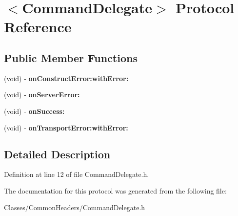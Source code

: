 \hypertarget{protocol_command_delegate-p}{
\section{$<$CommandDelegate$>$ Protocol Reference}
\label{protocol_command_delegate-p}
}
\subsection*{Public Member Functions}
\begin{DoxyCompactItemize}
\item 
\hypertarget{protocol_command_delegate-p_aeec7f0de9f0ccf16527f0f02f2f881b1}{
(void) -\/ {\bfseries onConstructError:withError:}}
\label{protocol_command_delegate-p_aeec7f0de9f0ccf16527f0f02f2f881b1}

\item 
\hypertarget{protocol_command_delegate-p_ab56f4560c3c0d7342909b4ac85b394ab}{
(void) -\/ {\bfseries onServerError:}}
\label{protocol_command_delegate-p_ab56f4560c3c0d7342909b4ac85b394ab}

\item 
\hypertarget{protocol_command_delegate-p_a53d0285c8843f950227fe6007f1fb836}{
(void) -\/ {\bfseries onSuccess:}}
\label{protocol_command_delegate-p_a53d0285c8843f950227fe6007f1fb836}

\item 
\hypertarget{protocol_command_delegate-p_ad49391487825dc83f4c49226fa9ed874}{
(void) -\/ {\bfseries onTransportError:withError:}}
\label{protocol_command_delegate-p_ad49391487825dc83f4c49226fa9ed874}

\end{DoxyCompactItemize}


\subsection{Detailed Description}


Definition at line 12 of file CommandDelegate.h.



The documentation for this protocol was generated from the following file:\begin{DoxyCompactItemize}
\item 
Classes/CommonHeaders/CommandDelegate.h\end{DoxyCompactItemize}
